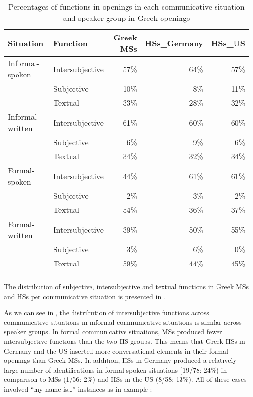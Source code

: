 \documentclass[output=paper,colorlinks,citecolor=brown]{langscibook}
\begin{document}
\begin{table}
\caption{Percentages of functions in openings in each communicative situation and speaker group in Greek openings}
\label{tab:katsikaetal:Greekfunctiosopen}
 \begin{tabular}{llrrr}
   \lsptoprule
    Situation & Function & Greek MSs & HSs\_Germany & HSs\_US\\
 \midrule
  Informal-spoken & Intersubjective & 57\% & 64\% & 57\%\\
                  & Subjective & 10\% & 8\% & 11\%\\
                  & Textual & 33\% & 28\% & 32\% \\
  Informal-written & Intersubjective & 61\% & 60\% & 60\%\\
                  & Subjective & 6\% & 9\% & 6\%\\
                  & Textual & 34\% & 32\% & 34\%\\
  Formal-spoken   & Intersubjective & 44\% & 61\% & 61\%\\
                  & Subjective & 2\% & 3\% & 2\%\\
                  & Textual & 54\% & 36\% & 37\%\\
  Formal-written  & Intersubjective & 39\% & 50\% & 55\%\\
                  & Subjective & 3\% & 6\% & 0\%\\
                  & Textual & 59\% & 44\% & 45\%\\
  \lspbottomrule
  \end{tabular}
  \end{table}
  
The distribution of subjective, intersubjective and textual functions in Greek MSs and HSs per communicative situation is presented in . 

As we can see in , the distribution of intersubjective functions across communicative situations in informal communicative situations is similar across speaker groups. In formal communicative situations, MSs produced fewer intersubjective functions than the two HS groups. This means that Greek HSs in Germany and the US inserted more conversational elements in their formal openings than Greek MSs. In addition, HSs in Germany produced a relatively large number of identifications in formal-spoken situations (19/78: 24\%) in comparison to MSs (1/56: 2\%) and HSs in the US (8/58: 13\%). All of these cases involved “my name is…” instances as in example :
\end{document}
